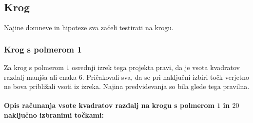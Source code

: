 \documentclass[a4paper]{report}
\begin{document}
\subsection{Krog}

Najine domneve in hipoteze sva začeli testirati na krogu.

\subsubsection{Krog s polmerom 1}

Za krog s polmerom $1$ osrednji izrek tega projekta pravi, da je vsota kvadratov razdalj manjša ali enaka $6$. Pričakovali sva, da se pri naključni izbiri točk verjetno ne bova približali vsoti iz izreka. Najina predvidevanja so bila glede tega pravilna. \\ \\
\textbf{Opis računanja vsote kvadratov razdalj na krogu s polmerom $1$ in $20$ naključno izbranimi točkami:}
\end{document}
